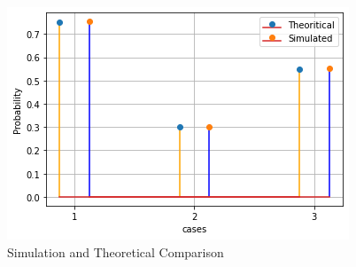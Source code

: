 \begin{figure}[ht]
    \centering
    \includegraphics[width=\columnwidth]{solutions/5/28/Figures/stem.png}
    \caption{Simulation and Theoretical Comparison}
    \label{Figure_3}
\end{figure}

